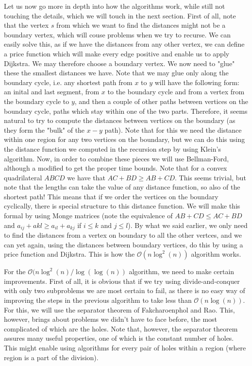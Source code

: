 \documentclass[11pt]{article}
\begin{document}
Let us now go more in depth into how the algorithms work, while still not touching the details, which we will touch in the next section. First of all, note that the vertex $s$ from which we want to find the distances might not be a boundary vertex, which will couse problems when we try to recurse. We can easily solve this, as if we have the distances from any other vertex, we can define a price function which will make every edge positive and enable us to apply Dijkstra. We may therefore choose a boundary vertex. We now need to "glue" these the smallest distances we have. Note that we may glue only along the boundary cycle, i.e. any shortest path from $x$ to $y$ will have the following form: an inital and last segment, from $x$ to the boundary cycle and from a vertex from the boundary cycle to $y$, and then a couple of other paths between vertices on the boundary cycle, paths which stay within one of the two parts. Therefore, it seems natural to try to compute the distances between vertices on the boundary (as they form the "bulk" of the $x-y$ path). Note that
for this we need the distance within one region for any two vertices on the boundary, but we can do this using the distance function we computed in the recursion step by using Klein's algorithm. Now, in order to combine these pieces we will use Bellman-Ford, although a modified to get the proper time bounds. Note that for a convex quadrilateral $ABCD$ we have that $AC+BD\geq AB+CD$. This seems trivial, but note that  the lengths can take the value of any distance function, so also of the shortest path! This means that if we order the vertices on the boundary cyclically, there is special structure to this distance function. We will make this formal by using Monge matrices (note the equivalence of $AB+CD\leq AC+BD$ and $a_{ij}+a{kl}\geq a_{il}+a_{kj}$ if $i\leq k$ and $j\leq l$). By what we said earlier, we only need to find the distances from a vertex on boundary to  all the other vertces, and we can yet again, using the distances between boundary vertices, do this by using a price function and Dijkstra. This is how the $\mathcal{O}(n\log^2(n))$ algorithm works.

For the $\mathcal{O}(n\log^2(n)/\log(\log(n))$ algorithm, we need to make certain improvements. First of all, it is obvious that if we try using divide-and-conquer with only two subproblems we are most certain to fail, as there is no easy way of improving the steps in the previous algorithm to take less than $\mathcal{O}(n\log(n))$. For this, we will use the separator theorem of Fakcharoenphol and Rao. This, however, brings about problems we didn't have to face before, the most complicated of which are the holes. Note that, however, the separator theorem assures many useful properties, one of which is the constant number of holes. This might enable using algorithms for every pair of holes within a region (where region is a part of the division).
\end{document}
